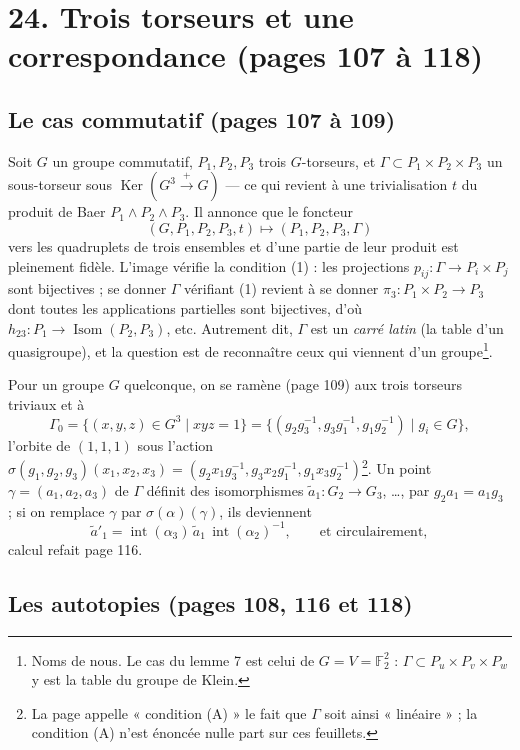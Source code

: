 \documentclass[11pt,a4paper]{article}
\begin{document}
\section*{24. Trois torseurs et une correspondance (pages 107 à 118)}

\subsection*{Le cas commutatif (pages 107 à 109)}

Soit $G$ un groupe commutatif, $P_1, P_2, P_3$ trois $G$-torseurs, et $\Gamma
\subset P_1 \times P_2 \times P_3$ un sous-torseur sous $\operatorname{Ker}(G^3
\xrightarrow{+} G)$ --- ce qui revient à une trivialisation $t$ du produit de
Baer $P_1 \wedge P_2 \wedge P_3$. Il annonce que le foncteur
\[
(G, P_1, P_2, P_3, t) \longmapsto (P_1, P_2, P_3, \Gamma)
\]
vers les quadruplets de trois ensembles et d'une partie de leur produit est
pleinement fidèle. L'image vérifie la condition (1) : les projections $p_{ij} :
\Gamma \to P_i \times P_j$ sont bijectives ; se donner $\Gamma$ vérifiant (1)
revient à se donner $\pi_3 : P_1 \times P_2 \to P_3$ dont toutes les
applications partielles sont bijectives, d'où $h_{23} : P_1 \to
\operatorname{Isom}(P_2, P_3)$, etc. Autrement dit, $\Gamma$ est un \emph{carré
latin} (la table d'un quasigroupe), et la question est de reconnaître ceux qui
viennent d'un groupe\footnote{Noms de nous. Le cas du lemme 7 est celui de $G
= V = \mathbb{F}_2^2$ : $\Gamma \subset P_u \times P_v \times P_w$ y est la
table du groupe de Klein.}.

Pour un groupe $G$ quelconque, on se ramène (page 109) aux trois torseurs
triviaux et à
\[
\Gamma_0 = \lbrace (x, y, z) \in G^3 \mid xyz = 1\rbrace = \lbrace (g_2
g_3^{-1}, g_3 g_1^{-1}, g_1 g_2^{-1}) \mid g_i \in G\rbrace ,
\]
l'orbite de $(1, 1, 1)$ sous l'action $\sigma(g_1, g_2, g_3)(x_1, x_2, x_3) =
(g_2 x_1 g_3^{-1}, g_3 x_2 g_1^{-1}, g_1 x_3 g_2^{-1})$\footnote{La page
appelle « condition (A) » le fait que $\Gamma$ soit ainsi « linéaire » ; la
condition (A) n'est énoncée nulle part sur ces feuillets.}. Un point $\gamma =
(a_1, a_2, a_3)$ de $\Gamma$ définit des isomorphismes $\tilde a_1 : G_2 \to
G_3$, \ldots, par $g_2 a_1 = a_1 g_3$ ; si on remplace $\gamma$ par
$\sigma(\alpha)(\gamma)$, ils deviennent
\[
\tilde a'_1 = \operatorname{int}(\alpha_3)\, \tilde a_1\,
\operatorname{int}(\alpha_2)^{-1}, \qquad \text{et circulairement},
\]
calcul refait page 116.

\subsection*{Les autotopies (pages 108, 116 et 118)}
\end{document}
